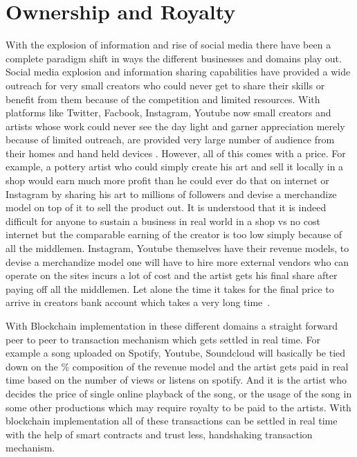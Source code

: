 \section{Ownership and Royalty}

With the explosion of information and rise of social media there have
been a complete paradigm shift in ways the different businesses and
domains play out. Social media explosion and information sharing
capabilities have provided a wide outreach for very small creators who
could never get to share their skills or benefit from them because of
the competition and limited resources. With platforms like
Twitter, Facbook, Instagram, Youtube now small creators
and artists whose work could never see the day light and garner
appreciation merely because of limited outreach, are provided very
large number of audience from their homes and hand held devices
\cite{saleem24}. However, all of this comes with a price. For example,
a pottery artist who could simply create his art and sell it locally
in a shop would earn much more profit than he could ever do that on
internet or Instagram by sharing his art to millions of followers and
devise a merchandize model on top of it to sell the product out. It is
understood that it is indeed difficult for anyone to sustain a business
in real world in a shop vs no cost internet but the comparable earning
of the creator is too low simply because of all the middlemen.
Instagram, Youtube themselves have their revenue models, to devise a
merchandize model one will have to hire more external vendors who can
operate on the sites incurs a lot of cost and the artist gets his
final share after paying off all the middlemen. Let alone the time it
takes for the final price to arrive in creators bank account which
takes a very long time~\cite{margaret25}.

With Blockchain implementation in these different domains a straight
forward peer to peer to transaction mechanism which gets settled in
real time. For example a song uploaded on Spotify, Youtube,
Soundcloud will basically be tied down on the \% composition of the
revenue model and the artist gets paid in real time based on the
number of views or listens on spotify. And it is the artist who decides
the price of single online playback of the song, or the usage of the
song in some other productions which may require royalty to be paid to
the artists. With blockchain implementation all of these transactions
can be settled in real time with the help of smart contracts and trust
less, handshaking transaction mechanism.


